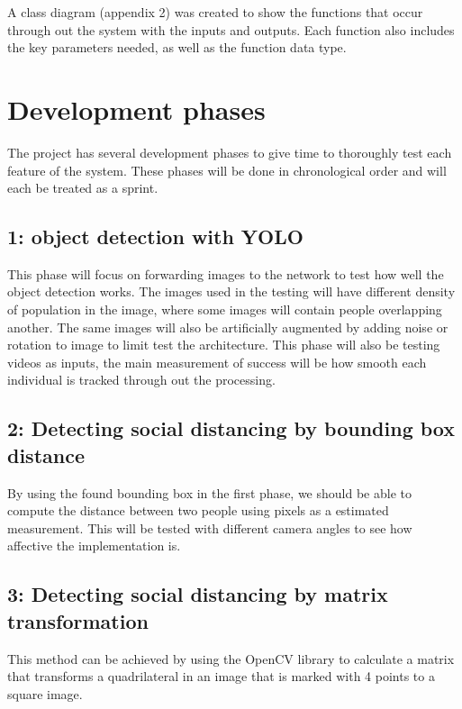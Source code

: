 \documentclass[12pt]{report}
\begin{document}
\vspace{10mm}

A class diagram (appendix 2) was created to show the functions that occur through out the system with the inputs and outputs. Each function also includes the key parameters needed, as well as the function data type.

\section{Development phases}

The project has several development phases to give time to thoroughly test each feature of the system. These phases will be done in chronological order and will each be treated as a sprint.

\subsection{1: object detection with YOLO}

This phase will focus on forwarding images to the network to test how well the object detection works. The images used in the testing will have different density of population in the image, where some images will contain people overlapping another. The same images will also be artificially augmented by adding noise or rotation to image to limit test the architecture. This phase will also be testing videos as inputs, the main measurement of success will be how smooth each individual is tracked through out the processing.

\subsection{2: Detecting social distancing by bounding box distance}

By using the found bounding box in the first phase, we should be able to compute the distance between two people using pixels as a estimated measurement. This will be tested with different camera angles to see how affective the implementation is.

\subsection{3: Detecting social distancing by matrix transformation}

This method can be achieved by using the OpenCV library to calculate a matrix that transforms a quadrilateral in an image that is marked with 4 points to a square image.
\end{document}
